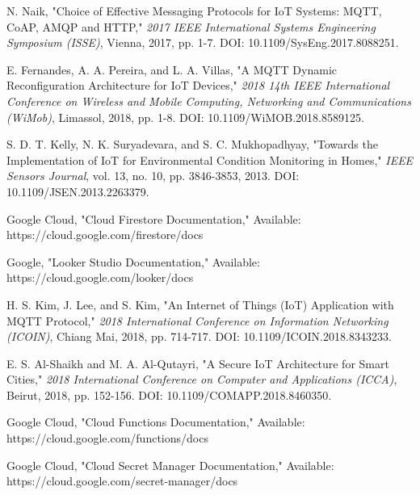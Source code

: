 \documentclass[conference]{IEEEtran}
\begin{document}
\begin{thebibliography}{99}
     N. Naik, "Choice of Effective Messaging Protocols for IoT Systems: MQTT, CoAP, AMQP and HTTP," \textit{2017 IEEE International Systems Engineering Symposium (ISSE)}, Vienna, 2017, pp. 1-7. DOI: 10.1109/SysEng.2017.8088251.

     E. Fernandes, A. A. Pereira, and L. A. Villas, "A MQTT Dynamic Reconfiguration Architecture for IoT Devices," \textit{2018 14th IEEE International Conference on Wireless and Mobile Computing, Networking and Communications (WiMob)}, Limassol, 2018, pp. 1-8. DOI: 10.1109/WiMOB.2018.8589125.

     S. D. T. Kelly, N. K. Suryadevara, and S. C. Mukhopadhyay, "Towards the Implementation of IoT for Environmental Condition Monitoring in Homes," \textit{IEEE Sensors Journal}, vol. 13, no. 10, pp. 3846-3853, 2013. DOI: 10.1109/JSEN.2013.2263379.

     Google Cloud, "Cloud Firestore Documentation," Available: https://cloud.google.com/firestore/docs

     Google, "Looker Studio Documentation," Available: https://cloud.google.com/looker/docs

     H. S. Kim, J. Lee, and S. Kim, "An Internet of Things (IoT) Application with MQTT Protocol," \textit{2018 International Conference on Information Networking (ICOIN)}, Chiang Mai, 2018, pp. 714-717. DOI: 10.1109/ICOIN.2018.8343233.

     E. S. Al-Shaikh and M. A. Al-Qutayri, "A Secure IoT Architecture for Smart Cities," \textit{2018 International Conference on Computer and Applications (ICCA)}, Beirut, 2018, pp. 152-156. DOI: 10.1109/COMAPP.2018.8460350.

     Google Cloud, "Cloud Functions Documentation," Available: https://cloud.google.com/functions/docs

     Google Cloud, "Cloud Secret Manager Documentation," Available: https://cloud.google.com/secret-manager/docs

\end{thebibliography}
\end{document}
